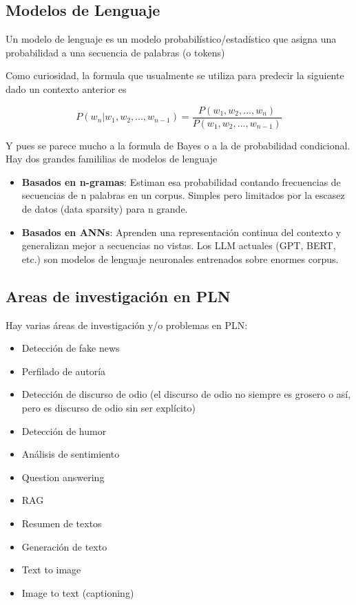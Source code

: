 \documentclass[11pt,letterpaper]{article}
\begin{document}
\subsection*{Modelos de Lenguaje}

\begin{idea}
    Un modelo de lenguaje es un modelo probabilístico/estadístico que asigna una probabilidad a una secuencia de palabras (o tokens)
\end{idea}

Como curiosidad, la formula que usualmente se utiliza para predecir la siguiente dado un contexto anterior
es

\begin{equation}
    P(w_n | w_1, w_2, ..., w_{n-1}) = \frac{P(w_1, w_2, ..., w_n)}{P(w_1, w_2, ..., w_{n-1})}
\end{equation}

Y pues se parece mucho a la formula de Bayes o a la de probabilidad condicional.
Hay dos grandes famililias de modelos de lenguaje

\begin{itemize}
    \item \textbf{Basados en n-gramas}: Estiman esa probabilidad contando frecuencias de secuencias de n palabras en un corpus. Simples pero limitados por la escasez de datos (data sparsity) para n grande.
    \item \textbf{Basados en ANNs}: Aprenden una representación continua del contexto y generalizan mejor a secuencias no vistas. Los LLM actuales (GPT, BERT, etc.) son modelos de lenguaje neuronales entrenados sobre enormes corpus.
\end{itemize}

\subsection*{Areas de investigación en PLN}
Hay varias áreas de investigación y/o problemas en PLN:
\begin{itemize}
    \item Detección de fake news 
    \item Perfilado de autoría 
    \item Detección de discurso de odio (el discurso de odio no siempre es grosero o así, pero es discurso de odio sin ser explícito)
    \item Detección de humor 
    \item Análisis de sentimiento 
    \item Question answering 
    \item RAG
    \item Resumen de textos
    \item Generación de texto
    \item Text to image 
    \item Image to text (captioning)
\end{itemize}
\end{document}
